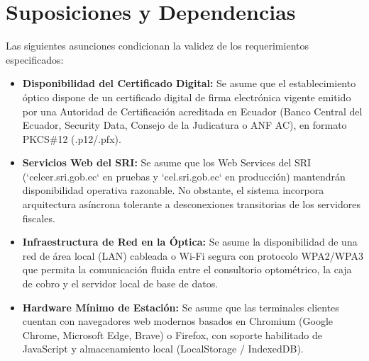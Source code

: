 \documentclass[12pt,a4paper]{report}
\begin{document}
\section{Suposiciones y Dependencias}
Las siguientes asunciones condicionan la validez de los requerimientos especificados:
\begin{itemize}
    \item \textbf{Disponibilidad del Certificado Digital:} Se asume que el establecimiento óptico dispone de un certificado digital de firma electrónica vigente emitido por una Autoridad de Certificación acreditada en Ecuador (Banco Central del Ecuador, Security Data, Consejo de la Judicatura o ANF AC), en formato PKCS\#12 (.p12/.pfx).
    \item \textbf{Servicios Web del SRI:} Se asume que los Web Services del SRI (`celcer.sri.gob.ec` en pruebas y `cel.sri.gob.ec` en producción) mantendrán disponibilidad operativa razonable. No obstante, el sistema incorpora arquitectura asíncrona tolerante a desconexiones transitorias de los servidores fiscales.
    \item \textbf{Infraestructura de Red en la Óptica:} Se asume la disponibilidad de una red de área local (LAN) cableada o Wi-Fi segura con protocolo WPA2/WPA3 que permita la comunicación fluida entre el consultorio optométrico, la caja de cobro y el servidor local de base de datos.
    \item \textbf{Hardware Mínimo de Estación:} Se asume que las terminales clientes cuentan con navegadores web modernos basados en Chromium (Google Chrome, Microsoft Edge, Brave) o Firefox, con soporte habilitado de JavaScript y almacenamiento local (LocalStorage / IndexedDB).
\end{itemize}
\end{document}
